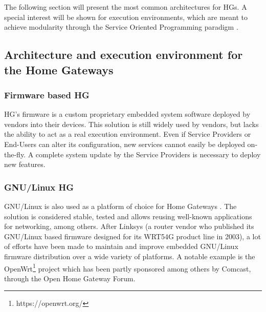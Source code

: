  
The following section will present the most common architectures for HGs.
A special interest will be shown for execution environments, which are meant to achieve modularity through the Service Oriented Programming paradigm \cite{bieber2001introduction}.


\subsection{Architecture and execution environment for the Home Gateways}

\subsubsection{Firmware based HG}
HG's firmware is a custom proprietary embedded system software deployed by vendors into their devices.
This solution is still widely used by vendors, but lacks the ability to act as a real execution environment.
Even if Service Providers or End-Users can alter its configuration, new services cannot easily be deployed on-the-fly.
A complete system update by the Service Providers is necessary to deploy new features.
   
\subsubsection{GNU/Linux HG}
   
GNU/Linux is also used as a platform of choice for Home Gateways \cite{royon_multiservice_2007}.
The solution is considered stable, tested and allows reusing well-known applications for networking, among others.
After Linksys (a router vendor who published its GNU/Linux based firmware designed for its WRT54G product line in 2003), a lot of efforts have been made to maintain and improve embedded GNU/Linux firmware distribution over a wide variety of platforms.
A notable example is the OpenWrt\footnote{https://openwrt.org/} project which has been partly sponsored among others by Comcast, through the Open Home Gateway Forum.

